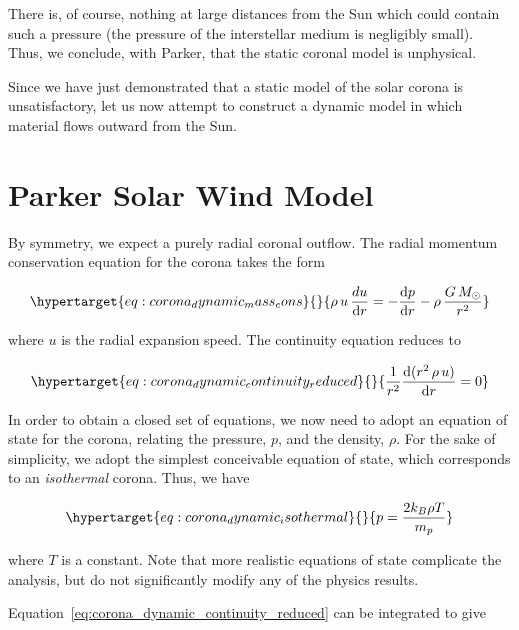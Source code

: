 \documentclass[
  notoc %
]{tufte-book}
\begin{document}
There is, of course, nothing at large distances from the Sun which could
contain such a pressure (the pressure of the interstellar medium is
negligibly small). Thus, we conclude, with Parker, that the static
coronal model is unphysical.

Since we have just demonstrated that a static model of the solar corona
is unsatisfactory, let us now attempt to construct a dynamic model in
which material flows outward from the Sun.

\hypertarget{parker-solar-wind-model}{%
\section{Parker Solar Wind Model}\label{parker-solar-wind-model}}

By symmetry, we expect a purely radial coronal outflow. The radial
momentum conservation equation for the corona takes the form

\begin{equation}\protect\hypertarget{eq:corona_dynamic_mass_cons}{}{
\rho\,u\,\frac{du}{\mathrm{d}r} = -\frac{\mathrm{d}p}{\mathrm{d}r} - \rho\,\frac{G\,M_\odot}{r^2}
}\label{eq:corona_dynamic_mass_cons}\end{equation}

where \(u\) is the radial expansion speed. The continuity equation
reduces to

\begin{equation}\protect\hypertarget{eq:corona_dynamic_continuity_reduced}{}{
\frac{1}{r^2}\frac{\mathrm{d}(r^2\,\rho\,u)}{\mathrm{d}r} = 0
}\label{eq:corona_dynamic_continuity_reduced}\end{equation}

In order to obtain a closed set of equations, we now need to adopt an
equation of state for the corona, relating the pressure, \(p\), and the
density, \(\rho\). For the sake of simplicity, we adopt the simplest
conceivable equation of state, which corresponds to an \emph{isothermal}
corona. Thus, we have

\begin{equation}\protect\hypertarget{eq:corona_dynamic_isothermal}{}{
p = \frac{2k_B\rho T}{m_p}
}\label{eq:corona_dynamic_isothermal}\end{equation}

where \(T\) is a constant. Note that more realistic equations of state
complicate the analysis, but do not significantly modify any of the
physics results.

Equation~\ref{eq:corona_dynamic_continuity_reduced} can be integrated to
give
\end{document}
